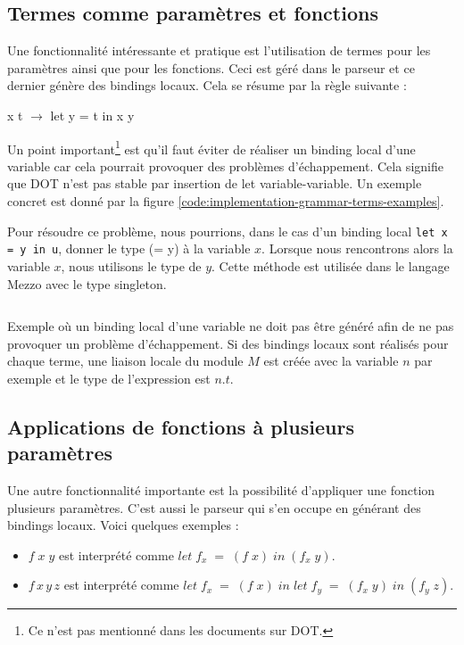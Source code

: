 \subsection*{Termes comme paramètres et fonctions}

Une fonctionnalité intéressante et pratique est l'utilisation de
termes pour les paramètres ainsi que pour les fonctions. Ceci
est géré dans le parseur et ce dernier génère des bindings locaux. Cela se
résume par la règle suivante :

\begin{center}
  x t $\rightarrow$ let y = t in x y
\end{center}

Un point important\footnote{Ce n'est pas mentionné dans les documents sur
DOT.} est qu'il faut éviter de réaliser un binding local d'une variable car
cela pourrait provoquer des problèmes d'échappement. Cela signifie que DOT n'est
pas stable par insertion de let variable-variable. Un exemple concret est donné
par la figure \ref{code:implementation-grammar-terms-examples}.

Pour résoudre ce problème, nous pourrions, dans le cas d'un binding local
\verb|let x = y in u|, donner le type (= y) à la variable $x$. Lorsque nous
rencontrons alors la variable $x$, nous utilisons le type de $y$. Cette méthode
est utilisée dans le langage Mezzo\cite{} avec le type singleton.

\begin{listing}
  \label{code:implementation-grammar-terms-examples}
  \inputminted{OCaml}{codes/terms_binding_variable.rml}
  \caption{Exemple où un binding local d'une variable ne doit pas être généré
    afin de ne pas provoquer un problème d'échappement. Si des bindings locaux
    sont réalisés pour chaque terme, une liaison locale du module $M$ est
    créée avec la variable $n$ par exemple et le type de l'expression est $n.t$.}
\end{listing}

\subsection*{Applications de fonctions à plusieurs paramètres}

Une autre fonctionnalité importante est la possibilité d'appliquer une fonction plusieurs
paramètres. C'est aussi le parseur qui s'en occupe en générant
des bindings locaux. Voici quelques exemples :

\begin{itemize}
\item $f \; x \; y$ est interprété comme $let \; f_{x} \; = \; (f \; x) \; in \;
  (f_{x} \; y)$.
\item $f \,  x \, y \, z$ est interprété comme $let \; f_{x} \; = \; (f \; x) \;
  in \; let \; f_{y} \; = \; (f_{x} \; y) \; in \; (f_{y} \; z)$.
\end{itemize}

